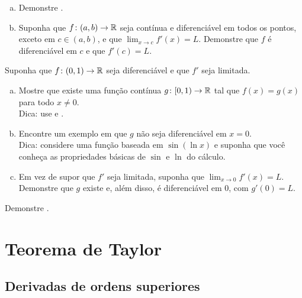 \begin{exercise} \label{exercise:endpointderivative}
\leavevmode
\begin{enumerate}[a)]
\item
Demonstre .
\item 
Suponha que $f \colon (a,b) \to {\mathbb{R}}$ seja contínua e diferenciável em todos os pontos, exceto em $c \in (a,b)$, e que $\lim_{x \to c} f'(x)=L$. Demonstre que $f$ é diferenciável em $c$ e que $f'(c)=L$.
\end{enumerate}
\end{exercise}

\begin{exercise} \label{exercise:extendboundedder}
Suponha que $f \colon (0,1) \to {\mathbb{R}}$ seja diferenciável e que $f'$ seja limitada.
\begin{enumerate}[a)]
\item
Mostre que existe uma função contínua $g \colon [0,1) \to {\mathbb{R}}$ tal que $f(x)=g(x)$ para todo $x \neq 0$.\\
Dica: use  e .
\item
Encontre um exemplo em que $g$ não seja diferenciável em $x=0$.
\\
Dica: considere uma função baseada em $\sin(\ln x)$ e suponha que você conheça as propriedades básicas de $\sin$ e $\ln$ do cálculo.
\item
Em vez de supor que $f'$ seja limitada, suponha que $\lim_{x \to 0} f'(x)=L$. Demonstre que $g$ existe e, além disso, é diferenciável em $0$, com $g'(0)=L$.
\end{enumerate}
\end{exercise}

\begin{exercise}
Demonstre .
\end{exercise}


\sectionnewpage
\section{Teorema de Taylor}
\label{sec:taylor}



\subsection{Derivadas de ordens superiores}

